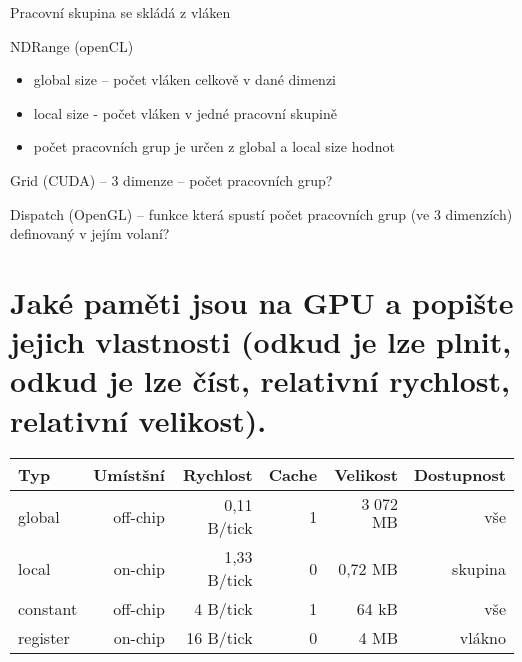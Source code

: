 	Pracovní skupina se skládá z vláken

	NDRange (openCL)
	\begin{itemize}
		\setlength\itemsep{0em}
		\item global size -- počet vláken celkově v dané dimenzi
		\item local size - počet vláken v jedné pracovní skupině
		\item počet pracovních grup je určen z global a local size hodnot
	\end{itemize}

	Grid (CUDA) -- 3 dimenze -- počet pracovních grup?

	Dispatch (OpenGL) -- funkce která spustí počet pracovních grup (ve 3 dimenzích) definovaný v jejím volaní?


\section{Jaké paměti jsou na GPU a popište jejich vlastnosti (odkud je lze plnit, odkud je lze číst, relativní rychlost, relativní velikost).}
	\begin{center}
		\begin{tabular}{l|rrrrr}
			\textbf{Typ} & \textbf{Umístšní} & \textbf{Rychlost} & \textbf{Cache} & \textbf{Velikost} & \textbf{Dostupnost} \\ \hline
			global       & off-chip          & 0,11 B/tick        & 1              & $3\;072$ MB           & vše \\
			local        & on-chip           & 1,33 B/tick       & 0              & 0,72 MB           & skupina \\
			constant     & off-chip          & 4 B/tick          & 1              & 64 kB             & vše \\
			register     & on-chip           & 16 B/tick         & 0              & 4 MB              & vlákno                                 
		\end{tabular}
	\end{center}

